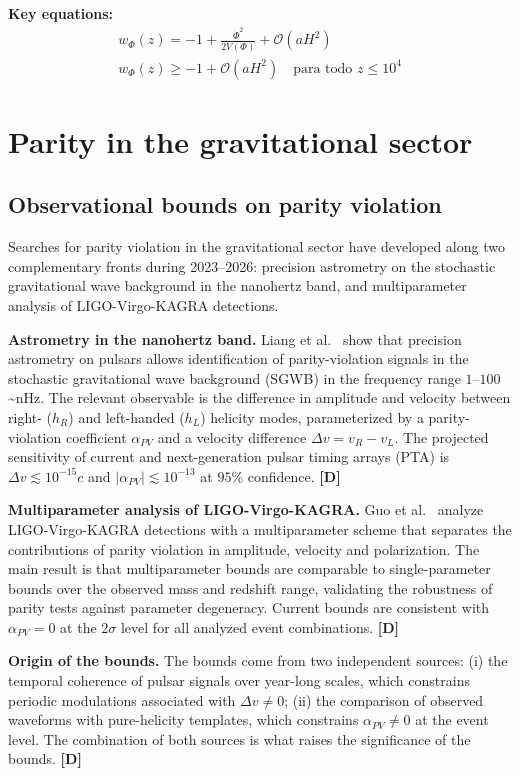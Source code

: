 ﻿\documentclass[11pt,letterpaper]{article}
\begin{document}
\textbf{Key equations:}
\begin{align*}
    w_\Phi(z) = -1 + \frac{\dot\Phi^2}{2V(\Phi)} + \mathcal{O}(aH^2) \\
    w_\Phi(z) \geq -1 + \mathcal{O}(aH^2) \quad \text{para todo } z \leq 10^4
\end{align*}
\section{Parity in the gravitational sector}
\subsection{Observational bounds on parity violation}
Searches for parity violation in the gravitational sector have developed along two complementary fronts during 2023--2026: precision astrometry on the stochastic gravitational wave background in the nanohertz band, and multiparameter analysis of LIGO-Virgo-KAGRA detections.

\textbf{Astrometry in the nanohertz band.} Liang et al.\ \cite{Liang2023} show that precision astrometry on pulsars allows identification of parity-violation signals in the stochastic gravitational wave background (SGWB) in the frequency range $1$--$100$\textasciitilde{}nHz. The relevant observable is the difference in amplitude and velocity between right- ($h_R$) and left-handed ($h_L$) helicity modes, parameterized by a parity-violation coefficient $\alpha_{PV}$ and a velocity difference $\Delta v = v_R - v_L$. The projected sensitivity of current and next-generation pulsar timing arrays (PTA) is $\Delta v \lesssim 10^{-15}c$ and $|\alpha_{PV}| \lesssim 10^{-13}$ at $95\%$ confidence. \textbf{[D]}

\textbf{Multiparameter analysis of LIGO-Virgo-KAGRA.} Guo et al.\ \cite{Guo2026} analyze LIGO-Virgo-KAGRA detections with a multiparameter scheme that separates the contributions of parity violation in amplitude, velocity and polarization. The main result is that multiparameter bounds are comparable to single-parameter bounds over the observed mass and redshift range, validating the robustness of parity tests against parameter degeneracy. Current bounds are consistent with $\alpha_{PV} = 0$ at the $2\sigma$ level for all analyzed event combinations. \textbf{[D]}

\textbf{Origin of the bounds.} The bounds come from two independent sources: (i) the temporal coherence of pulsar signals over year-long scales, which constrains periodic modulations associated with $\Delta v \neq 0$; (ii) the comparison of observed waveforms with pure-helicity templates, which constrains $\alpha_{PV} \neq 0$ at the event level. The combination of both sources is what raises the significance of the bounds. \textbf{[D]}
\end{document}
